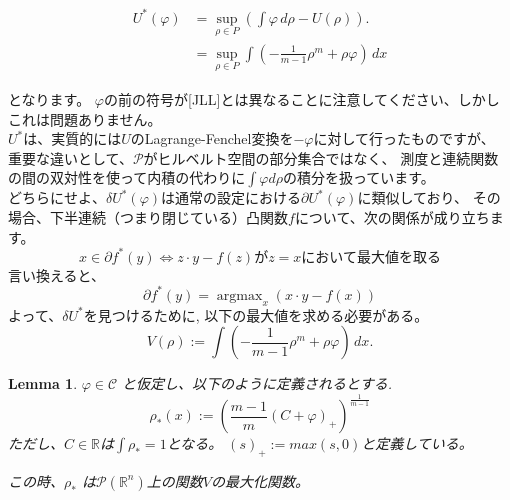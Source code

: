 \documentclass{jsarticle}
\newtheorem{lem}[thm]{Lemma}
\theoremstyle{definition}
\begin{document}
\begin{align*}
  U^*(\varphi) &= \sup_{\rho \in P} \left( \int \varphi \, d\rho - U(\rho) \right).\\
               &= \sup_{\rho \in P} \int \left(- \frac{1}{m-1}\rho^m + \rho\varphi\right) \, dx
\end{align*}

となります。
$\varphi$の前の符号が[JLL]とは異なることに注意してください、しかしこれは問題ありません。\\

$U^*$は、実質的には$U$のLagrange-Fenchel変換を$-\varphi$に対して行ったものですが、
重要な違いとして、$\mathcal{P}$がヒルベルト空間の部分集合ではなく、
測度と連続関数の間の双対性を使って内積の代わりに$\int \varphi d \rho$の積分を扱っています。\\

{\color{teal}
どちらにせよ、$\delta U^*(\varphi)$は通常の設定における$\partial U^*(\varphi)$に類似しており、
その場合、下半連続（つまり閉じている）凸関数$f$について、次の関係が成り立ちます。}
\[
  x \in \partial f^*(y) \iff z \cdot y - f(z) \text{が} z = x \text{において最大値を取る}
\]
言い換えると、
\[
  \partial f^*(y) = \operatorname{argmax}_x (x \cdot y - f(x))
\]
{\color{teal}
よって、$\delta U^*$を見つけるために, 以下の最大値を求める必要がある。
\[
  V(\rho) := \int \left(- \frac{1}{m-1}\rho^m + \rho\varphi\right) \, dx.
\]
}
\vspace\baselineskip 

\begin{lem}
  $\varphi \in \mathcal{C}$ と仮定し、以下のように定義されるとする.
  $$
    \rho_*(x) := \left( \frac{m-1}{m}(C + \varphi)_+ \right)^{\frac{1}{m-1}} 
  $$
  ただし、$C \in \mathbb{R}$は$\int \rho_* = 1$となる。
  $(s)_+ := max(s, 0)$と定義している。

  この時、$\rho_*$ は$\mathcal{P}(\mathbb{R}^n)$上の関数$V$の最大化関数。
\end{lem}
\end{document}
